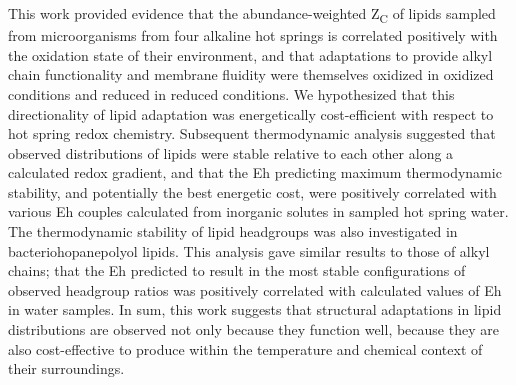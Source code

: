 This work provided evidence that the abundance-weighted Z\textsubscript{C} of lipids sampled from microorganisms from four alkaline hot springs is correlated positively with the oxidation state of their environment, and that adaptations to provide alkyl chain functionality and membrane fluidity were themselves oxidized in oxidized conditions and reduced in reduced conditions. We hypothesized that this directionality of lipid adaptation was energetically cost-efficient with respect to hot spring redox chemistry. Subsequent thermodynamic analysis suggested that observed distributions of lipids were stable relative to each other along a calculated redox gradient, and that the Eh predicting maximum thermodynamic stability, and potentially the best energetic cost, were positively correlated with various Eh couples calculated from inorganic solutes in sampled hot spring water. The thermodynamic stability of lipid headgroups was also investigated in bacteriohopanepolyol lipids. This analysis gave similar results to those of alkyl chains; that the Eh predicted to result in the most stable configurations of observed headgroup ratios was positively correlated with calculated values of Eh in water samples. In sum, this work suggests that structural adaptations in lipid distributions are observed not only because they function well, because they are also cost-effective to produce within the temperature and chemical context of their surroundings.
